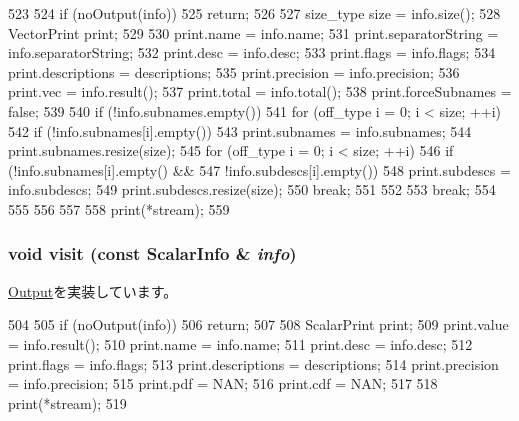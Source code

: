 \begin{DoxyCode}
523 {
524     if (noOutput(info))
525         return;
526 
527     size_type size = info.size();
528     VectorPrint print;
529 
530     print.name = info.name;
531     print.separatorString = info.separatorString;
532     print.desc = info.desc;
533     print.flags = info.flags;
534     print.descriptions = descriptions;
535     print.precision = info.precision;
536     print.vec = info.result();
537     print.total = info.total();
538     print.forceSubnames = false;
539 
540     if (!info.subnames.empty()) {
541         for (off_type i = 0; i < size; ++i) {
542             if (!info.subnames[i].empty()) {
543                 print.subnames = info.subnames;
544                 print.subnames.resize(size);
545                 for (off_type i = 0; i < size; ++i) {
546                     if (!info.subnames[i].empty() &&
547                         !info.subdescs[i].empty()) {
548                         print.subdescs = info.subdescs;
549                         print.subdescs.resize(size);
550                         break;
551                     }
552                 }
553                 break;
554             }
555         }
556     }
557 
558     print(*stream);
559 }
\end{DoxyCode}
\hypertarget{classStats_1_1Text_ac9ee55cac7bc664352aeaffda82dc689}{
\subsubsection[{visit}]{\setlength{\rightskip}{0pt plus 5cm}void visit (const {\bf ScalarInfo} \& {\em info})}}
\label{classStats_1_1Text_ac9ee55cac7bc664352aeaffda82dc689}


\hyperlink{structStats_1_1Output_a49159171d27306e1e047691f43efab71}{Output}を実装しています。


\begin{DoxyCode}
504 {
505     if (noOutput(info))
506         return;
507 
508     ScalarPrint print;
509     print.value = info.result();
510     print.name = info.name;
511     print.desc = info.desc;
512     print.flags = info.flags;
513     print.descriptions = descriptions;
514     print.precision = info.precision;
515     print.pdf = NAN;
516     print.cdf = NAN;
517 
518     print(*stream);
519 }
\end{DoxyCode}


